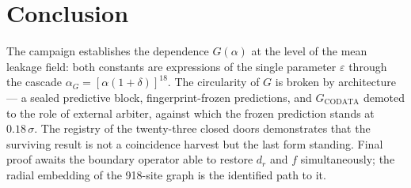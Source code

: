 \documentclass[11pt,a4paper]{article}
\begin{document}
\section{Conclusion}
The campaign establishes the dependence $G(\alpha)$ at the level of the mean leakage field: both constants are expressions of the single parameter $\varepsilon$ through the cascade $\alpha_G = [\alpha(1+\delta)]^{18}$. The circularity of $G$ is broken by architecture --- a sealed predictive block, fingerprint-frozen predictions, and $G_{\mathrm{CODATA}}$ demoted to the role of external arbiter, against which the frozen prediction stands at $0.18\,\sigma$. The registry of the twenty-three closed doors demonstrates that the surviving result is not a coincidence harvest but the last form standing. Final proof awaits the boundary operator able to restore $d_r$ and $f$ simultaneously; the radial embedding of the 918-site graph is the identified path to it.

\nocite{*}


\end{document}
